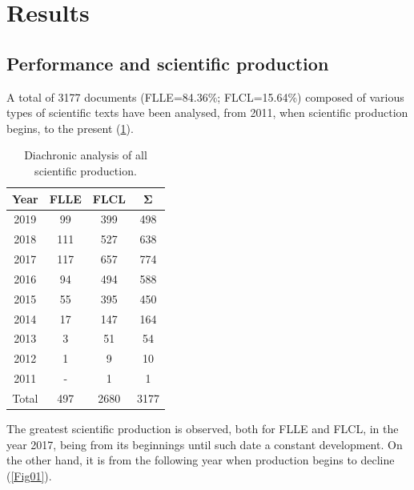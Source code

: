 \documentclass{textolivre}
\begin{document}
\section{Results}\label{sec-fmt-results}
\subsection{Performance and scientific production}\label{sec-fmt-performance}
A total of 3177 documents (FLLE=84.36\%; FLCL=15.64\%) composed of various types of scientific texts have been analysed, from 2011, when scientific production begins, to the present (\cref{tbl-tabela-03}).

\begin{table}[htpb]
\caption{Diachronic analysis of all scientific production.}
\label{tbl-tabela-03}
\centering
\begin{tabular}{cccc}
\toprule
\textbf{Year} & \textbf{FLLE} & \textbf{FLCL} & \textbf{Σ} \\ 
\midrule
2019          & 99            & 399           & 498        \\ 
2018          & 111           & 527           & 638        \\ 
2017          & 117           & 657           & 774        \\ 
2016          & 94            & 494           & 588        \\ 
2015          & 55            & 395           & 450        \\ 
2014          & 17            & 147           & 164        \\ 
2013          & 3             & 51            & 54         \\ 
2012          & 1             & 9             & 10         \\ 
2011          & -             & 1             & 1          \\ 
Total         & 497           & 2680          & 3177       \\ 
\bottomrule
\end{tabular}
\end{table}

The greatest scientific production is observed, both for FLLE and FLCL, in the year 2017, being from its beginnings until such date a constant development. On the other hand, it is from the following year when production begins to decline (\cref{Fig01}).
\end{document}
